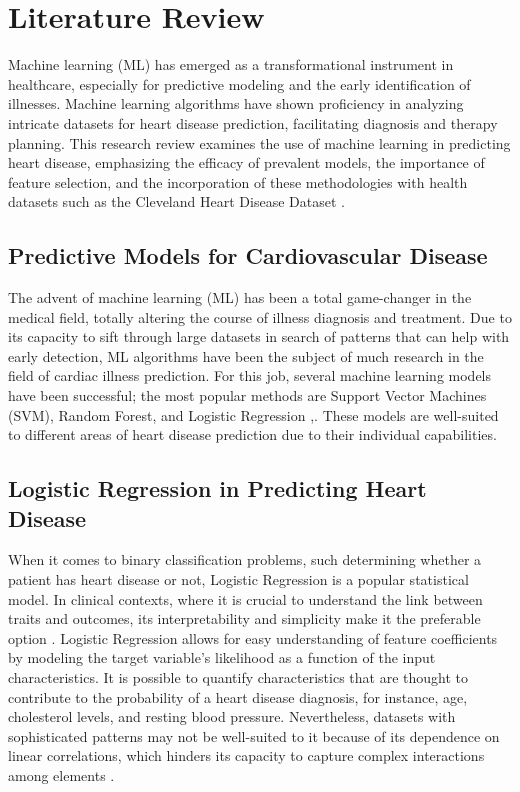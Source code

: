 \section{Literature Review}
Machine learning (ML) has emerged as a transformational instrument in healthcare, especially for predictive modeling and the early identification of illnesses. Machine learning algorithms have shown proficiency in analyzing intricate datasets for heart disease prediction, facilitating diagnosis and therapy planning. This research review examines the use of machine learning in predicting heart disease, emphasizing the efficacy of prevalent models, the importance of feature selection, and the incorporation of these methodologies with health datasets such as the Cleveland Heart Disease Dataset \cite{battineni2020diagnosis}.

\subsection{Predictive Models for Cardiovascular Disease}
The advent of machine learning (ML) has been a total game-changer in the medical field, totally altering the course of illness diagnosis and treatment. Due to its capacity to sift through large datasets in search of patterns that can help with early detection, ML algorithms have been the subject of much research in the field of cardiac illness prediction. For this job, several machine learning models have been successful; the most popular methods are Support Vector Machines (SVM), Random Forest, and Logistic Regression \cite{zhou2021machine},\cite{ren2017forest}. These models are well-suited to different areas of heart disease prediction due to their individual capabilities.

\subsection{Logistic Regression in Predicting Heart Disease}
When it comes to binary classification problems, such determining whether a patient has heart disease or not, Logistic Regression is a popular statistical model. In clinical contexts, where it is crucial to understand the link between traits and outcomes, its interpretability and simplicity make it the preferable option \cite{battineni2020diagnosis}. Logistic Regression allows for easy understanding of feature coefficients by modeling the target variable's likelihood as a function of the input characteristics. It is possible to quantify characteristics that are thought to contribute to the probability of a heart disease diagnosis, for instance, age, cholesterol levels, and resting blood pressure. Nevertheless, datasets with sophisticated patterns may not be well-suited to it because of its dependence on linear correlations, which hinders its capacity to capture complex interactions among elements \cite{zhou2021machine}.

